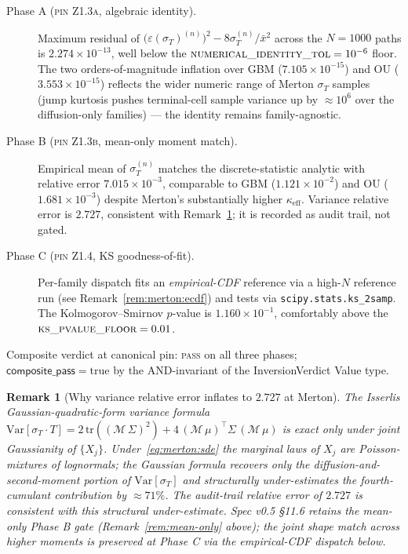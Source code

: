 \documentclass[11pt,letterpaper]{article}
\newtheorem{remark}{Remark}[section]
\newcommand{\Var}{\text{Var}}
\newcommand{\sigmaT}{\sigma_{T}}
\newcommand{\epsT}{\varepsilon(\sigmaT)}
\newcommand{\xbar}{\bar{x}}
\newcommand{\centerProj}{\mathcal{M}}
\newcommand{\PinZ}[1]{\textsc{pin Z1.#1}}
\begin{document}
\begin{description}
    \item[Phase A (\PinZ{3a}, algebraic identity).]
        Maximum residual of
        $\bigl(\epsT^{(n)}\bigr)^{2} - 8\sigmaT^{(n)}/\xbar^{2}$
        across the $N = 1000$ paths is $2.274\times 10^{-13}$, well below
        the $\textsc{numerical\_identity\_tol} = 10^{-6}$ floor. The two
        orders-of-magnitude inflation over GBM ($7.105\times 10^{-15}$)
        and OU ($3.553\times 10^{-15}$) reflects the wider numeric range
        of Merton $\sigmaT$ samples (jump kurtosis pushes terminal-cell
        sample variance up by $\approx 10^{6}$ over the diffusion-only
        families) — the identity remains family-agnostic.
    \item[Phase B (\PinZ{3b}, mean-only moment match).]
        Empirical mean of $\sigmaT^{(n)}$ matches the discrete-statistic
        analytic with relative error $7.015\times 10^{-3}$, comparable
        to GBM ($1.121\times 10^{-2}$) and OU ($1.681\times 10^{-3}$)
        despite Merton's substantially higher $\kappa_{\text{eff}}$.
        Variance relative error is $2.727$, consistent with
        Remark~\ref{rem:merton:var-rel-err}; it is recorded as audit
        trail, not gated.
    \item[Phase C (\PinZ{4}, KS goodness-of-fit).]
        Per-family dispatch fits an \emph{empirical-CDF} reference via
        a high-$N$ reference run (see Remark~\ref{rem:merton:ecdf}) and
        tests via \texttt{scipy.stats.ks\_2samp}. The Kolmogorov--Smirnov
        $p$-value is $1.160\times 10^{-1}$, comfortably above the
        $\textsc{ks\_pvalue\_floor} = 0.01$.
\end{description}

Composite verdict at canonical pin: \textsc{pass} on all three phases;
$\textsf{composite\_pass} = \mathrm{true}$ by the AND-invariant of the
\textsf{InversionVerdict} Value type.

\begin{remark}[Why variance relative error inflates to $2.727$ at Merton]
\label{rem:merton:var-rel-err}
The Isserlis Gaussian-quadratic-form variance formula
$\Var[\sigmaT \cdot T] = 2\,\mathrm{tr}((\centerProj\,\Sigma)^{2}) +
4\,(\centerProj\,\mu)^{\top}\Sigma\,(\centerProj\,\mu)$ is exact only
under joint Gaussianity of $\{X_{j}\}$. Under~\eqref{eq:merton:sde}
the marginal laws of $X_{j}$ are Poisson-mixtures of lognormals; the
Gaussian formula recovers only the diffusion-and-second-moment portion
of $\Var[\sigmaT]$ and structurally under-estimates the fourth-cumulant
contribution by $\approx 71\%$. The audit-trail relative error of
$2.727$ is consistent with this structural under-estimate. Spec v0.5
\S11.6 retains the mean-only Phase B gate (Remark~\ref{rem:mean-only}
above); the joint shape match across higher moments is preserved at
Phase C via the empirical-CDF dispatch below.
\end{remark}
\end{document}
